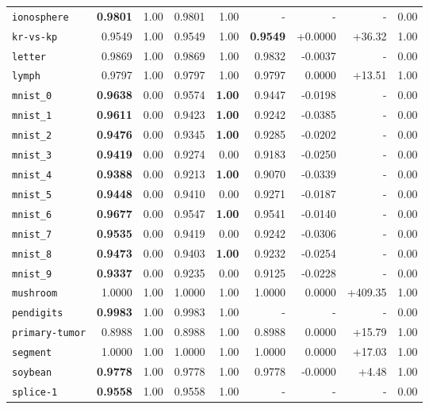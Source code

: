 \begin{tabular}{lrrrrrrrr}
\texttt{ionosphere} & \textbf{0.9801} & 1.00 & 0.9801 & 1.00 & - & - & - & 0.00\\
\texttt{kr-vs-kp} & 0.9549 & 1.00 & 0.9549 & 1.00 & \textbf{0.9549} & +0.0000 & +36.32 & 1.00\\
\texttt{letter} & 0.9869 & 1.00 & 0.9869 & 1.00 & 0.9832 & -0.0037 & - & 0.00\\
\texttt{lymph} & 0.9797 & 1.00 & 0.9797 & 1.00 & 0.9797 & 0.0000 & +13.51 & 1.00\\
\texttt{mnist\_0} & \textbf{0.9638} & 0.00 & 0.9574 & \textbf{1.00} & 0.9447 & -0.0198 & - & 0.00\\
\texttt{mnist\_1} & \textbf{0.9611} & 0.00 & 0.9423 & \textbf{1.00} & 0.9242 & -0.0385 & - & 0.00\\
\texttt{mnist\_2} & \textbf{0.9476} & 0.00 & 0.9345 & \textbf{1.00} & 0.9285 & -0.0202 & - & 0.00\\
\texttt{mnist\_3} & \textbf{0.9419} & 0.00 & 0.9274 & 0.00 & 0.9183 & -0.0250 & - & 0.00\\
\texttt{mnist\_4} & \textbf{0.9388} & 0.00 & 0.9213 & \textbf{1.00} & 0.9070 & -0.0339 & - & 0.00\\
\texttt{mnist\_5} & \textbf{0.9448} & 0.00 & 0.9410 & 0.00 & 0.9271 & -0.0187 & - & 0.00\\
\texttt{mnist\_6} & \textbf{0.9677} & 0.00 & 0.9547 & \textbf{1.00} & 0.9541 & -0.0140 & - & 0.00\\
\texttt{mnist\_7} & \textbf{0.9535} & 0.00 & 0.9419 & 0.00 & 0.9242 & -0.0306 & - & 0.00\\
\texttt{mnist\_8} & \textbf{0.9473} & 0.00 & 0.9403 & \textbf{1.00} & 0.9232 & -0.0254 & - & 0.00\\
\texttt{mnist\_9} & \textbf{0.9337} & 0.00 & 0.9235 & 0.00 & 0.9125 & -0.0228 & - & 0.00\\
\texttt{mushroom} & 1.0000 & 1.00 & 1.0000 & 1.00 & 1.0000 & 0.0000 & +409.35 & 1.00\\
\texttt{pendigits} & \textbf{0.9983} & 1.00 & 0.9983 & 1.00 & - & - & - & 0.00\\
\texttt{primary-tumor} & 0.8988 & 1.00 & 0.8988 & 1.00 & 0.8988 & 0.0000 & +15.79 & 1.00\\
\texttt{segment} & 1.0000 & 1.00 & 1.0000 & 1.00 & 1.0000 & 0.0000 & +17.03 & 1.00\\
\texttt{soybean} & \textbf{0.9778} & 1.00 & 0.9778 & 1.00 & 0.9778 & -0.0000 & +4.48 & 1.00\\
\texttt{splice-1} & \textbf{0.9558} & 1.00 & 0.9558 & 1.00 & - & - & - & 0.00\\

\end{tabular}
